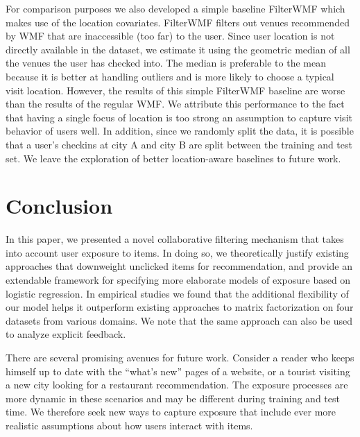 For comparison purposes we also developed a simple baseline FilterWMF which makes use of the
location covariates. FilterWMF filters out venues recommended by WMF that are inaccessible (too far) to the user. Since user
location is not directly available in the dataset, we estimate it using the
geometric median of all the venues the user has checked into. 
The median is preferable to the mean because it is better at handling outliers and is more likely to choose a typical visit location. 
However, the results of this simple FilterWMF baseline are worse than the results of the
regular WMF. We attribute this performance to the fact that having a single focus of location 
is too strong an assumption to capture visit behavior of users well. 
In addition, since we randomly split the data, it is possible that a user's
checkins at city A and city B are split between the training and test set.
We leave the exploration of better location-aware baselines to future work. 



\section{Conclusion}

%
%
%


In this paper, we presented a novel collaborative filtering mechanism
that takes into account user exposure to items. 
In doing so, we theoretically justify existing approaches that 
downweight unclicked items for recommendation, 
and provide an extendable framework 
for specifying more elaborate models of exposure based on logistic regression. 
In empirical studies we found 
that the additional flexibility of our model 
helps it outperform existing approaches to 
matrix factorization on four datasets from various domains. 
We note that the same approach can also be used 
to analyze explicit feedback. 

There are several promising avenues for future work. 
Consider a reader who keeps himself up to date with the ``what's new'' pages 
of a website, or 
a tourist visiting a new city looking for a restaurant recommendation. 
The exposure processes are more dynamic in these scenarios 
and may be different during training and test time. 
We therefore seek new ways to capture exposure that include 
ever more realistic assumptions about how users interact with items. 

